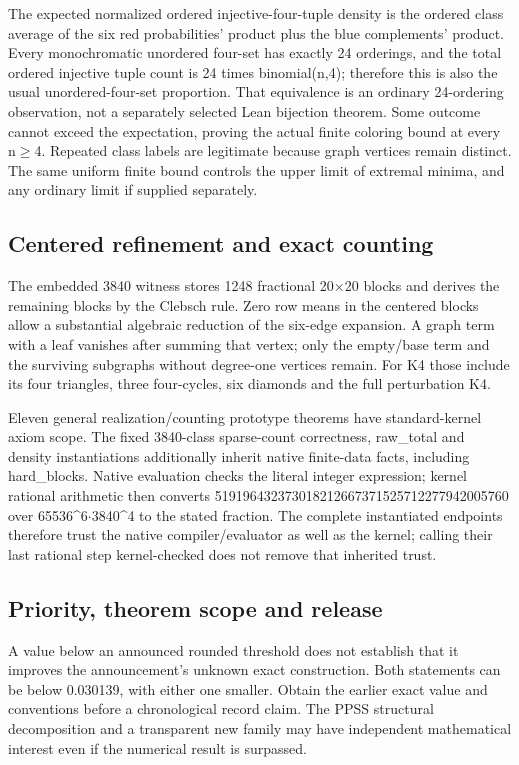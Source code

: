 \documentclass[11pt,a4paper]{article}
\begin{document}
The expected normalized ordered injective-four-tuple density is the ordered class average of the six red probabilities' product plus the blue complements' product. Every monochromatic unordered four-set has exactly 24 orderings, and the total ordered injective tuple count is 24 times binomial(n,4); therefore this is also the usual unordered-four-set proportion. That equivalence is an ordinary 24-ordering observation, not a separately selected Lean bijection theorem. Some outcome cannot exceed the expectation, proving the actual finite coloring bound at every n\ensuremath{\geq}4. Repeated class labels are legitimate because graph vertices remain distinct. The same uniform finite bound controls the upper limit of extremal minima, and any ordinary limit if supplied separately.

\subsection{Centered refinement and exact counting}
The embedded 3840 witness stores 1248 fractional 20\ensuremath{\times}20 blocks and derives the remaining blocks by the Clebsch rule. Zero row means in the centered blocks allow a substantial algebraic reduction of the six-edge expansion. A graph term with a leaf vanishes after summing that vertex; only the empty/base term and the surviving subgraphs without degree-one vertices remain. For K4 those include its four triangles, three four-cycles, six diamonds and the full perturbation K4.

Eleven general realization/counting prototype theorems have standard-kernel axiom scope. The fixed 3840-class sparse-count correctness, raw\_total and density instantiations additionally inherit native finite-data facts, including hard\_blocks. Native evaluation checks the literal integer expression; kernel rational arithmetic then converts 519196432373018212667371525712277942005760 over 65536\textasciicircum{}6\ensuremath{\cdot}3840\textasciicircum{}4 to the stated fraction. The complete instantiated endpoints therefore trust the native compiler/evaluator as well as the kernel; calling their last rational step kernel-checked does not remove that inherited trust.

\subsection{Priority, theorem scope and release}
A value below an announced rounded threshold does not establish that it improves the announcement's unknown exact construction. Both statements can be below 0.030139, with either one smaller. Obtain the earlier exact value and conventions before a chronological record claim. The PPSS structural decomposition and a transparent new family may have independent mathematical interest even if the numerical result is surpassed.
\end{document}
